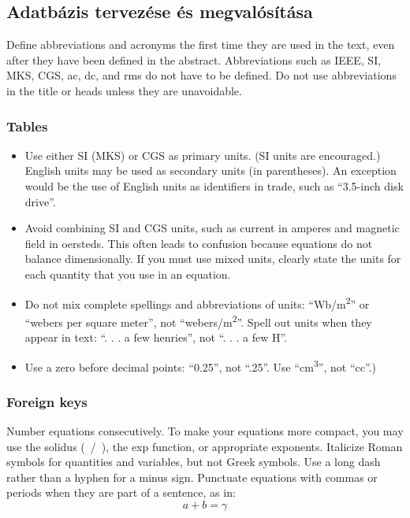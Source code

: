 \documentclass[conference]{IEEEtran}
\begin{document}
\subsection{Adatbázis tervezése és megvalósítása}\label{AA}
Define abbreviations and acronyms the first time they are used in the text, 
even after they have been defined in the abstract. Abbreviations such as 
IEEE, SI, MKS, CGS, ac, dc, and rms do not have to be defined. Do not use 
abbreviations in the title or heads unless they are unavoidable.

\subsubsection{Tables}
\begin{itemize}
\item Use either SI (MKS) or CGS as primary units. (SI units are encouraged.) English units may be used as secondary units (in parentheses). An exception would be the use of English units as identifiers in trade, such as ``3.5-inch disk drive''.
\item Avoid combining SI and CGS units, such as current in amperes and magnetic field in oersteds. This often leads to confusion because equations do not balance dimensionally. If you must use mixed units, clearly state the units for each quantity that you use in an equation.
\item Do not mix complete spellings and abbreviations of units: ``Wb/m\textsuperscript{2}'' or ``webers per square meter'', not ``webers/m\textsuperscript{2}''. Spell out units when they appear in text: ``. . . a few henries'', not ``. . . a few H''.
\item Use a zero before decimal points: ``0.25'', not ``.25''. Use ``cm\textsuperscript{3}'', not ``cc''.)
\end{itemize}

\subsubsection{Foreign keys}
Number equations consecutively. To make your 
equations more compact, you may use the solidus (~/~), the exp function, or 
appropriate exponents. Italicize Roman symbols for quantities and variables, 
but not Greek symbols. Use a long dash rather than a hyphen for a minus 
sign. Punctuate equations with commas or periods when they are part of a 
sentence, as in:
\begin{equation}
a+b=\gamma\label{eq}
\end{equation}
\end{document}
